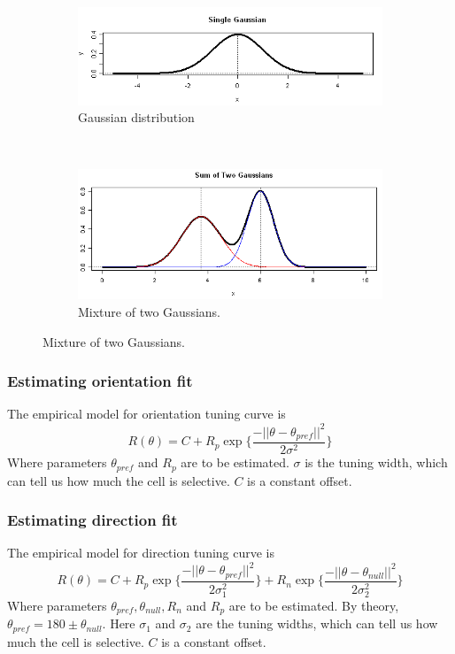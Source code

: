 \documentclass[11pt]{article}
\newcommand{\rulesep}{\unskip\ \vrule\ }
\begin{document}
\begin{figure}
\centering
\caption{Modeling orientation and directional selectivity using Gaussians}
\label{gauss}
\begin{subfigure}{.48\textwidth}
    \centering
    \includegraphics[width=\linewidth]{plots/gauss.png}
    \caption{Gaussian distribution}
\end{subfigure}
\rulesep
\begin{subfigure}{.48\textwidth}
    \centering
    \includegraphics[width=\linewidth]{plots/double_gauss.png}
    \caption{Mixture of two Gaussians.}
\end{subfigure}
\end{figure}

\subsubsection{Estimating orientation fit} %
\label{ssub:estimating_orientation_fit}
The empirical model for orientation tuning curve is
$$R(\theta) = C + R_p \exp\{\frac{-||\theta-\theta_{pref}||^2}{2\sigma^2}\}$$
Where parameters $\theta_{pref}$ and $R_p$ are to be estimated. $\sigma$ is the tuning width, which can tell us how much the cell is selective. $C$ is a constant offset.\\


\subsubsection{Estimating direction fit} %
\label{ssub:estimating_direction_fit}
The empirical model for direction tuning curve is
$$R(\theta) = C + R_p \exp\{\frac{-||\theta-\theta_{pref}||^2}{2\sigma_1^2}\} + R_n \exp\{\frac{-||\theta-\theta_{null}||^2}{2\sigma_2^2}\}$$
Where parameters $\theta_{pref}, \theta_{null}, R_n$ and $R_p$ are to be estimated. By theory, $\theta_{pref} = 180 \pm \theta_{null}$. Here $\sigma_1$ and $\sigma_2$ are the tuning widths, which can tell us how much the cell is selective. $C$ is a constant offset.\\
\end{document}
